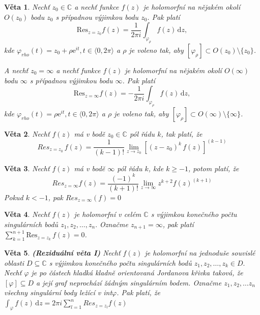\documentclass[a4]{report}
\newcommand{\fce}{\text{funkce }}
\newcommand{\dd}{\mathrm{d}}
\newcommand{\fz}{$f(z)$ }
\newcommand{\CC}{\mathbb{C}}
\newtheorem{theorem}{Věta}
\theoremstyle{definition}
\begin{document}
\begin{theorem}
Nechť $z_0\in \CC$ a nechť funkce \fz je holomorfní na nějakém okolí $O(z_0)$ bodu $z_0$ s případnou výjimkou bodu $z_0$. Pak platí 
\begin{equation*}
\mathrm{Res}_{z=z_0}f(z)=\frac{1}{2\pi i}\int_{\varphi_{\rho}}f(z) \, \mathrm{d} z,
\end{equation*}
 kde $\varphi_{rho}(t)=z_0+\rho\mathrm{e}^{it}, t \in \langle 0,2\pi \rangle$ a $\rho$ je voleno tak, aby $[\varphi_{\rho}] \subset O(z_0) \setminus \{z_0\}$.
 
 A nechť  $z_0=\infty $ a nechť funkce \fz je holomorfní na nějakém okolí $O(\infty)$ bodu $\infty$ s případnou výjimkou bodu $\infty$. Pak platí 
\begin{equation*}
\mathrm{Res}_{z=\infty}f(z)=-\frac{1}{2\pi i}\int_{\varphi_{\rho}}f(z) \, \mathrm{d} z,
\end{equation*}
 kde $\varphi_{rho}(t)=\rho\mathrm{e}^{it}, t \in \langle 0,2\pi \rangle$ a $\rho$ je voleno tak, aby $[\varphi_{\rho}] \subset O(\infty) \setminus \{\infty\}$.
 \end{theorem}

\begin{theorem}
	Nechť \fce \fz má v bodě $z_0 \in \CC$ pól řádu $k$, tak platí, že 
	$$Res_{z=z_0} \, f(z)=\frac{1 }{(k-1)!} \lim_{z\rightarrow z_0}[(z-z_0)^k \, f(z)]^{(k-1)}$$
\end{theorem}
\begin{theorem}
	Nechť \fce \fz má v bodě $\infty$ pól řádu $k$, kde $k \geq -1$, potom platí, že 
	$$Res_{z=\infty} f(z) = \frac{(-1)^k}{(k+1)!} \lim_{z \rightarrow \infty} z ^{k+2}f(z)^{(k+1)}$$
	Pokud $k<-1$, pak $Res_{z=\infty}(f)=0$
\end{theorem}


\begin{theorem}
	Nechť \fce \fz je holomorfní v celém $\CC$ s výjimkou konečného počtu singulárních bodů $z_1,z_2,\ldots, z_n. $ Označme $z_{n+1}=\infty$, pak platí  $\sum_{k=1}^{n+1}\text{Res}_{z=z_k}\, f(z)=0$.  
\end{theorem}

\begin{theorem}
\textbf{(Reziduální věta I)}
Nechť \fce \fz je holomorfní na jednoduše souvislé oblasti $D \subseteq \CC $ s výjimkou konečného počtu singulárních bodů $z_1,z_2,\ldots, z_k \in D.$ Nechť $\varphi$ je po částech hladká kladně orientovaná Jordanova křivka taková, že $[\varphi] \subseteq D $ a její graf neprochází žádným singulárním bodem. Označme $z_1,z_2,\ldots z_n$ všechny singulární body ležící v int$\varphi$. Pak platí, že $\int_{\varphi} f(z) \,  \dd z= 2\pi i\sum_{l=1}^{n}Res_{z=z_l} f(z)  $ 

\end{theorem}
\end{document}
